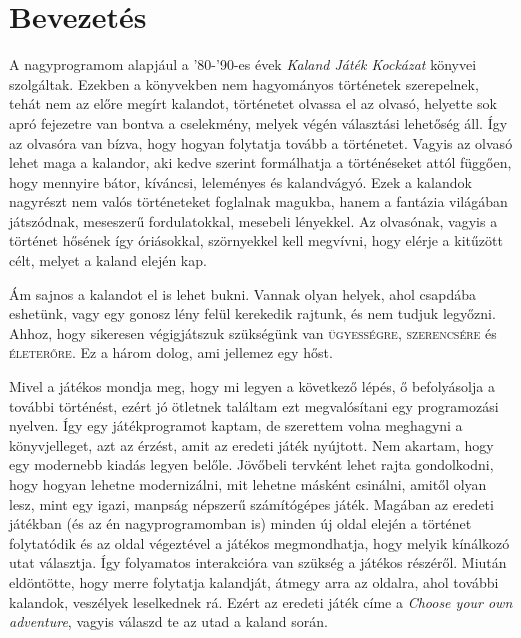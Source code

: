 \documentclass[12pt,a4paper,oneside]{report}
\newcommand{\stat}{\textsc}
\begin{document}

\tableofcontents

\newcommand{\chap}[1]{
  \addcontentsline{toc}{chapter}{#1}
  \addtocounter{chapter}{1}
  \setcounter{section}{0}
  \phantomsection
  \chapter*{#1}
}

\chapter*{Bevezetés}

  A nagyprogramom alapjául a '80-'90-es évek \emph{Kaland Játék Kockázat}
  könyvei szolgáltak. Ezekben a könyvekben nem hagyományos történetek
  szerepelnek, tehát nem az előre megírt kalandot, történetet olvassa el
  az olvasó, helyette sok apró fejezetre van bontva a cselekmény, melyek
  végén választási lehetőség áll. Így az olvasóra van bízva, hogy hogyan
  folytatja tovább a történetet. Vagyis az olvasó lehet maga a kalandor,
  aki kedve szerint formálhatja a történéseket attól függően, hogy
  mennyire bátor, kíváncsi, leleményes és kalandvágyó. Ezek a kalandok
  nagyrészt nem valós történeteket foglalnak magukba, hanem a fantázia
  világában játszódnak, meseszerű fordulatokkal, mesebeli lényekkel. Az
  olvasónak, vagyis a történet hősének így óriásokkal, szörnyekkel kell
  megvívni, hogy elérje a kitűzött célt, melyet a kaland elején kap.
  
  Ám sajnos a kalandot el is lehet bukni. Vannak olyan helyek, ahol
  csapdába eshetünk, vagy egy gonosz lény felül kerekedik rajtunk, és
  nem tudjuk legyőzni. Ahhoz, hogy sikeresen végigjátszuk szükségünk
  van \stat{ügyességre}, \stat{szerencsére} és \stat{életerőre}. Ez a
  három dolog, ami jellemez egy hőst.

  Mivel a játékos mondja meg, hogy mi legyen a következő lépés, ő
  befolyásolja a további történést, ezért jó ötletnek találtam ezt
  megvalósítani egy programozási nyelven. Így egy játékprogramot
  kaptam, de szerettem volna meghagyni a könyvjelleget, azt az érzést,
  amit az eredeti játék nyújtott. Nem akartam, hogy egy modernebb
  kiadás legyen belőle. Jövőbeli tervként lehet rajta gondolkodni,
  hogy hogyan lehetne modernizálni, mit lehetne másként csinálni,
  amitől olyan lesz, mint egy igazi, manpság népszerű számítógépes
  játék. Magában az eredeti játékban (és az én nagyprogramomban is)
  minden új oldal elején a történet folytatódik és az oldal végeztével
  a játékos megmondhatja, hogy melyik kínálkozó utat választja. Így
  folyamatos interakcióra van szükség a játékos részéről. Miután
  eldöntötte, hogy merre folytatja kalandját, átmegy arra az oldalra,
  ahol további kalandok, veszélyek leselkednek rá. Ezért az eredeti
  játék címe a \emph{Choose your own adventure}, vagyis válaszd te az
  utad a kaland során.
  
\end{document}
